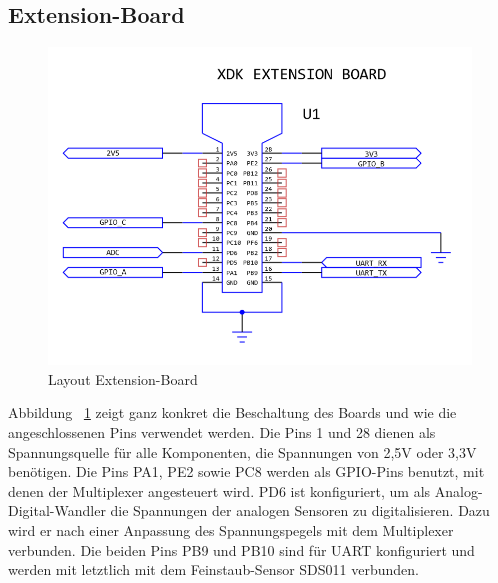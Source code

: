 \subsection{Extension-Board}\label{subsec:Extension-Board}
\begin{figure}[H]
	\includegraphics[width=\textwidth]{images/Layout_XDK.png}	
	\caption{Layout Extension-Board}
	\label{fig:Layout_ExtensionBoard}
\end{figure}
Abbildung ~\ref{fig:Layout_ExtensionBoard} zeigt ganz konkret die Beschaltung des Boards und wie die angeschlossenen Pins verwendet werden. Die Pins 1 und 28 dienen als Spannungsquelle für alle Komponenten, die Spannungen von 2,5V oder 3,3V benötigen. 
\newline
Die Pins PA1, PE2 sowie PC8 werden als \acs{GPIO}-Pins benutzt, mit denen der Multiplexer angesteuert wird.
\newline
PD6 ist konfiguriert, um als Analog-Digital-Wandler die Spannungen der analogen Sensoren zu digitalisieren. Dazu wird er nach einer Anpassung des Spannungspegels mit dem Multiplexer verbunden.
\newline
Die beiden Pins PB9 und PB10 sind für \acs{UART} konfiguriert und werden mit letztlich mit dem Feinstaub-Sensor SDS011 verbunden.
